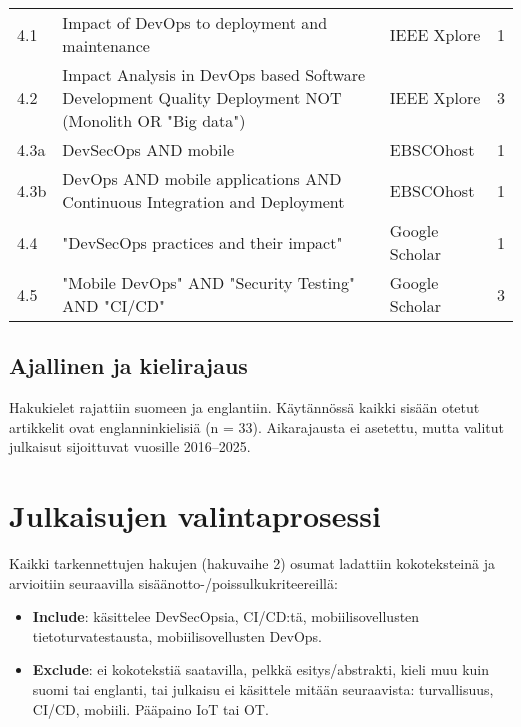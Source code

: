 \documentclass[bscthesis,finnish,oneside,biblatex]{uefcsthesis}
\begin{document}
\begin{table}[htbp]
\begin{tabularx}{\textwidth}{l>{\ttfamily\small\raggedright\arraybackslash}X l r}
            4.1  & Impact of DevOps to deployment and maintenance                                                                            & IEEE Xplore    & 1  \\
            4.2  & Impact Analysis in DevOps based Software Development Quality Deployment NOT (Monolith OR "Big data")                      & IEEE Xplore    & 3  \\
            4.3a & DevSecOps AND mobile                                                                                                      & EBSCOhost      & 1  \\
            4.3b & DevOps AND mobile applications AND Continuous Integration and Deployment                                                  & EBSCOhost      & 1  \\
            4.4  & "DevSecOps practices and their impact"                                                                                    & Google Scholar & 1  \\
            4.5  & "Mobile DevOps" AND "Security Testing" AND "CI/CD"                                                                        & Google Scholar & 3  \\
            \bottomrule
        \end{tabularx}
    \end{table}

    \subsection{Ajallinen ja kielirajaus}
    \label{sec:search-limits}

    Hakukielet rajattiin suomeen ja englantiin. Käytännössä kaikki sisään otetut artikkelit ovat englanninkielisiä (n = 33). Aikarajausta ei asetettu, mutta valitut julkaisut sijoittuvat vuosille 2016–2025.


    \section{Julkaisujen valintaprosessi}
    \label{sec:selection}

    Kaikki tarkennettujen hakujen (hakuvaihe 2) osumat ladattiin kokoteksteinä ja arvioitiin seuraavilla sisäänotto-/poissulkukriteereillä:

    \begin{itemize}
        \item \textbf{Include}: käsittelee DevSecOpsia, CI/CD:tä, mobiilisovellusten tietoturvatestausta, mobiilisovellusten DevOps.
        \item \textbf{Exclude}: ei kokotekstiä saatavilla, pelkkä esitys/abstrakti,
        kieli muu kuin suomi tai englanti, tai julkaisu ei käsittele mitään seuraavista: turvallisuus, CI/CD, mobiili. Pääpaino IoT tai OT.
    \end{itemize}
\end{document}
